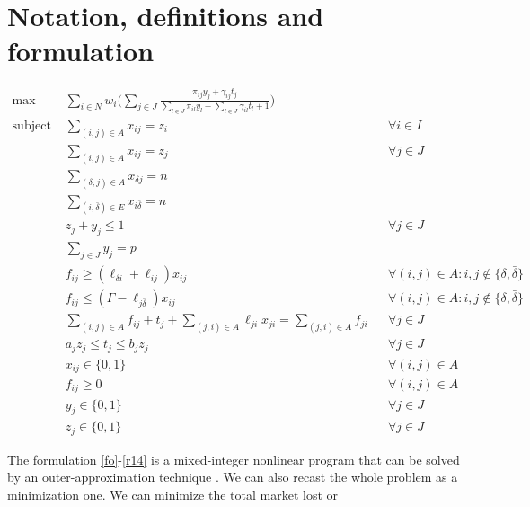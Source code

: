 \documentclass[num-refs]{wiley-networks}
\begin{document}
\section{Notation, definitions and formulation}
\pagebreak
\newpage

\begin{align}
    \label{fo} \max & \sum_{i \in N} w_i \Bigg(\sum_{j \in J} \frac{\pi_{ij} y_j + \gamma_{ij}t_j}{
    \sum_{l \in J} \pi_{il} y_l + \sum_{l \in J} \gamma_{il} t_l + 1}\Bigg) &&  \\
    \text{subject to: } 
    \label{r1a} & \sum_{(i,j) \in A} x_{ij} = z_i && \forall i \in I \\
    \label{r1b} & \sum_{(i,j) \in A} x_{ij} = z_j && \forall j \in J \\
    \label{r1b} & \sum_{(\delta,j) \in A} x_{\delta j} = n && \\
    \label{r1c} & \sum_{(i,\bar{\delta}) \in E} x_{i\bar{\delta}} = n && \\
    \label{r2} & z_j + y_j \leq 1 && \forall j \in J \\
    \label{r6} & \sum_{j \in J}  y_{j} = p \\
    \label{r3a} & f_{ij} \geq (\ell_{\delta i} + \ell_{ij}) x_{ij} && \forall (i,j) \in A : i,j \notin \{\delta, \bar{\delta}\} \\
    \label{r3b} & f_{ij} \leq (\Gamma - \ell_{j\bar{\delta}})  x_{ij} && \forall (i,j) \in A : i,j \notin \{\delta, \bar{\delta}\} \\
    \label{r3c} & \sum_{(i,j) \in A} f_{ij} + t_j + \sum_{(j,i) \in A} \ell_{ji} x_{ji} = \sum_{(j,i) \in A} f_{ji}  && \forall j \in J \\
    \label{r5} &  a_j z_j \leq t_j \leq b_j z_j && \forall j \in J\\
    \label{r12} & x_{ij} \in \{0,1\} && \forall (i,j) \in A\\
    \label{r15} & f_{ij} \geq 0  && \forall (i,j) \in A\\
    \label{r13} & y_j \in \{0,1\}    && \forall j \in J\\
    \label{r14} & z_j \in \{0,1\}    && \forall j \in J 
\end{align}

The formulation \eqref{fo}-\eqref{r14} is a mixed-integer nonlinear program that 
can be solved by an outer-approximation technique \citep{duran1986outer}.
We can also recast the whole problem as a minimization one. We can minimize the total market lost or 
\end{document}

